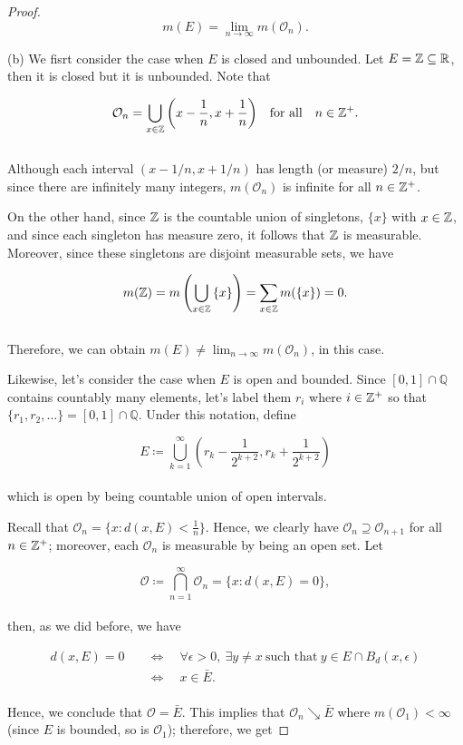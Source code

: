 \documentclass[12pt, a4paper, openany, twoside]{book}
\theoremstyle{definition}
\theoremstyle{remark}
\newcommand{\BQ}{{\mathbb {Q}}} \newcommand{\BR}{{\mathbb {R}}}
\theoremstyle{plain}
\numberwithin{equation}{section}
\begin{document}
\begin{proof}
    \[m(E)=\lim_{n\rightarrow\infty}{m(\mathcal{O}_n)}.\]

    \vspace{5mm}
    (b) We fisrt consider the case when $E$ is closed and unbounded. Let $E=\BZ\subseteq\BR$, then it is closed but it is unbounded. Note that

    \[\mathcal{O}_n=\bigcup_{x\in{\mathbb {Z}}}{\left(x-\frac{1}{n},x+\frac{1}{n}\right)}\quad\text{for all}\quad n\in{\mathbb {Z}}^+.\]
    \\
    Although each interval $(x-1/n,x+1/n)$ has length (or measure) $2/n$, but since there are infinitely many integers, $m(\mathcal{O}_n)$ is infinite for all $n\in{\mathbb {Z}}^+$. 
    
    On the other hand, since ${\mathbb {Z}}$ is the countable union of singletons, $\{x\}$ with $x\in{\mathbb {Z}}$, and since each singleton has measure zero, it follows that ${\mathbb {Z}}$ is measurable. Moreover, since these singletons are disjoint measurable sets, we have
    
    \[m({\mathbb {Z}})=m\left(\bigcup_{x\in{\mathbb {Z}}}{\{x\}}\right)=\sum_{x\in{\mathbb {Z}}}{m(\{x\})}=0.\]
    \\
    Therefore, we can obtain $m(E)\neq\lim_{n\rightarrow\infty}{m(\mathcal{O}_n)}$, in this case.

    \vspace{5mm}
    Likewise, let's consider the case when $E$ is open and bounded. Since $[0,1]\cap\BQ$ contains countably many elements, let's label them $r_i$ where $i\in{\mathbb {Z}}^+$ so that $\{r_1,r_2,\dots\}=[0,1]\cap\BQ$. Under this notation, define 

    \[E\coloneqq\bigcup_{k=1}^{\infty}{\left(r_k-\frac{1}{2^{k+2}},r_k+\frac{1}{2^{k+2}}\right)}\]
    \\
    which is open by being countable union of open intervals. 

    Recall that $\mathcal{O}_n=\{x:d(x,E)<\frac{1}{n}\}$. Hence, we clearly have $\mathcal{O}_n\supseteq\mathcal{O}_{n+1}$ for all $n\in{\mathbb {Z}}^+$; moreover, each $\mathcal{O}_n$ is measurable by being an open set. Let

    \[\mathcal{O}\coloneqq\bigcap_{n=1}^{\infty}{\mathcal{O}_n}=\{x:d(x,E)=0\},\]
    \\
    then, as we did before, we have
    
    \begin{align*}
        d(x,E)=0\quad&\Longleftrightarrow\quad\forall\epsilon>0,\ \exists y\neq x\ \text{such that}\ y\in E\cap B_d(x,\epsilon)\\
        &\Longleftrightarrow\quad x\in\bar{E}.
    \end{align*}
    \\
    Hence, we conclude that $\mathcal{O}=\bar{E}$. This implies that $\mathcal{O}_n\searrow\bar{E}$ where $m(\mathcal{O}_1)<\infty$ (since $E$ is bounded, so is $\mathcal{O}_1$); therefore, we get


\end{proof}
\end{document}
